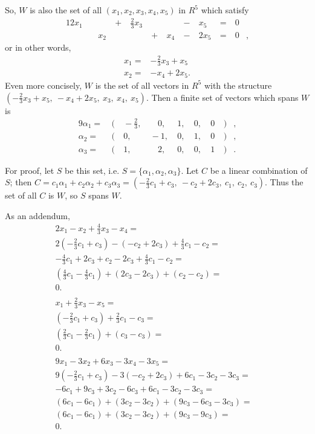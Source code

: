 \documentclass[12pt]{article}
\begin{document}
\begin{enumerate}
      So, $W$ is also the set of all $(x_1,x_2,x_3,x_4,x_5)$ in $R^5$ which satisfy
      \begin{alignat*}{12}
         x_1&   \ &     \ & +\ & \frac{2}{3}x_3\ &  \ &     \ & -\ &  x_5\ & =\ & 0&\\
            &   \ &  x_2\ &  \ &               \ & +\ &  x_4\ & -\ & 2x_5\ & =\ & 0&,
      \end{alignat*}
      or in other words,
      \begin{align*}
        x_1 =& -\frac{2}{3}x_3 + x_5\\
        x_2 =& -x_4 + 2x_5.
      \end{align*}
      Even more concisely, $W$ is the set of all vectors in $R^5$ with the structure
      $(-\frac{2}{3}x_3 + x_5,\ -x_4 + 2x_5,\ x_3,\ x_4,\ x_5)$. Then a finite set of
      vectors which spans $W$ is
      \begin{alignat*}{9}
        \alpha_1 =&\ (&\ -\frac{2}{3},&\ \ \ \ \ 0,&\ 1,&\ 0,&\ 0&\ )&,\\
        \alpha_2 =&\ (&\            0,&\ -1,&\ 0,&\ 1,&\ 0&\ )&,\\
        \alpha_3 =&\ (&\            1,&\ \ \ \ \ 2,&\ 0,&\ 0,&\ 1&\ )&.
      \end{alignat*}

      For proof, let $S$ be this set, i.e. $S = \{ \alpha_1, \alpha_2, \alpha_3 \}$.
      Let $C$ be a linear combination of $S$; then $C = c_1\alpha_1 + c_2\alpha_2 +
      c_3\alpha_3 = (-\frac{2}{3}c_1 + c_3,\ -c_2 + 2c_3,\ c_1,\ c_2,\ c_3)$. Thus
      the set of all $C$ is $W$, so $S$ spans $W$.

      As an addendum,
      \begin{align*}
        2x_1 - x_2 + \frac{4}{3}x_3 - x_4 =&\\
        2(-\frac{2}{3}c_1 + c_3) - (-c_2 + 2c_3) + \frac{4}{3}c_1 - c_2 =&\\
        -\frac{4}{3}c_1 + 2c_3 + c_2 - 2c_3 + \frac{4}{3}c_1 - c_2 =&\\
        (\frac{4}{3}c_1 - \frac{4}{3}c_1) + (2c_3 - 2c_3) + (c_2 - c_2) =&\\
        0.\ \ \ &\\\\
        x_1 + \frac{2}{3}x_3 - x_5 =&\\
        (-\frac{2}{3}c_1 + c_3) + \frac{2}{3}c_1 - c_3 =&\\
        (\frac{2}{3}c_1 - \frac{2}{3}c_1) + (c_3 - c_3) =&\\
        0.\ \ \ &\\\\
        9x_1 - 3x_2 + 6x_3 - 3x_4 - 3x_5 =&\\
        9(-\frac{2}{3}c_1 + c_3) - 3(-c_2 + 2c_3) + 6c_1 - 3c_2 - 3c_3 =&\\
        -6c_1 + 9c_3 + 3c_2 - 6c_3 + 6c_1 - 3c_2 - 3c_3 =&\\
        (6c_1 - 6c_1) + (3c_2 - 3c_2) + (9c_3 - 6c_3 - 3c_3) =&\\
        (6c_1 - 6c_1) + (3c_2 - 3c_2) + (9c_3 - 9c_3) =&\\
        0.\ \ \ &
      \end{align*}

  \end{enumerate}
\end{document}

